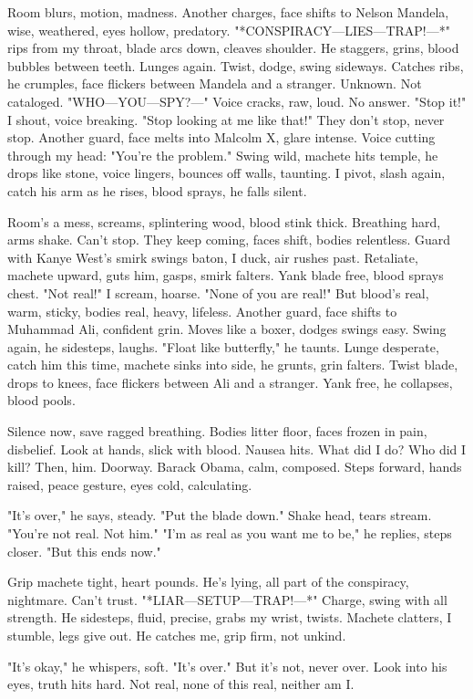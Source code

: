 \documentclass{article}
\begin{document}
Room blurs, motion, madness. Another charges, face shifts to Nelson Mandela, wise, weathered, eyes hollow, predatory. "*CONSPIRACY—LIES—TRAP!—*" rips from my throat, blade arcs down, cleaves shoulder. He staggers, grins, blood bubbles between teeth. Lunges again. Twist, dodge, swing sideways. Catches ribs, he crumples, face flickers between Mandela and a stranger. Unknown. Not cataloged. "WHO—YOU—SPY?—" Voice cracks, raw, loud. No answer. "Stop it!" I shout, voice breaking. "Stop looking at me like that!" They don't stop, never stop. Another guard, face melts into Malcolm X, glare intense. Voice cutting through my head: "You're the problem." Swing wild, machete hits temple, he drops like stone, voice lingers, bounces off walls, taunting. I pivot, slash again, catch his arm as he rises, blood sprays, he falls silent.

Room's a mess, screams, splintering wood, blood stink thick. Breathing hard, arms shake. Can't stop. They keep coming, faces shift, bodies relentless. Guard with Kanye West's smirk swings baton, I duck, air rushes past. Retaliate, machete upward, guts him, gasps, smirk falters. Yank blade free, blood sprays chest. "Not real!" I scream, hoarse. "None of you are real!" But blood's real, warm, sticky, bodies real, heavy, lifeless. Another guard, face shifts to Muhammad Ali, confident grin. Moves like a boxer, dodges swings easy. Swing again, he sidesteps, laughs. "Float like butterfly," he taunts. Lunge desperate, catch him this time, machete sinks into side, he grunts, grin falters. Twist blade, drops to knees, face flickers between Ali and a stranger. Yank free, he collapses, blood pools.

Silence now, save ragged breathing. Bodies litter floor, faces frozen in pain, disbelief. Look at hands, slick with blood. Nausea hits. What did I do? Who did I kill? Then, him. Doorway. Barack Obama, calm, composed. Steps forward, hands raised, peace gesture, eyes cold, calculating.

"It's over," he says, steady. "Put the blade down." Shake head, tears stream. "You're not real. Not him." "I'm as real as you want me to be," he replies, steps closer. "But this ends now."

Grip machete tight, heart pounds. He's lying, all part of the conspiracy, nightmare. Can't trust. "*LIAR—SETUP—TRAP!—*" Charge, swing with all strength. He sidesteps, fluid, precise, grabs my wrist, twists. Machete clatters, I stumble, legs give out. He catches me, grip firm, not unkind.

"It's okay," he whispers, soft. "It's over." But it's not, never over. Look into his eyes, truth hits hard. Not real, none of this real, neither am I.
\end{document}
